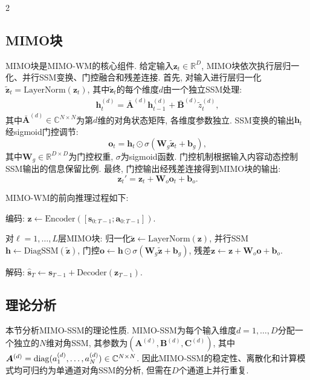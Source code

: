 \begin{multicols}{2}
\subsection{MIMO块}

\begin{Def}
MIMO块是MIMO-WM的核心组件.
给定输入${\bm z}_t \in \mathbb{R}^D$, MIMO块依次执行层归一化、并行SSM变换、门控融合和残差连接.
首先, 对输入进行层归一化$\tilde{{\bm z}}_t = \text{LayerNorm}({\bm z}_t)$,
其中$\tilde{{\bm z}}_t$的每个维度$d$由一个独立SSM处理:
\begin{eqnarray}
{\bm h}_t^{(d)} = \bar{{\bm A}}^{(d)}{\bm h}_{t-1}^{(d)} + \bar{{\bm B}}^{(d)}\tilde{z}_t^{(d)},
\end{eqnarray}
其中$\bar{{\bm A}}^{(d)} \in \mathbb{C}^{N \times N}$为第$d$维的对角状态矩阵, 各维度参数独立.
SSM变换的输出${\bm h}_t$经sigmoid门控调节:
\begin{equation}
{\bm o}_t = {\bm h}_t \odot \sigma({\bm W}_g\tilde{{\bm z}}_t + {\bm b}_g),
\end{equation}
其中${\bm W}_g \in \mathbb{R}^{D \times D}$为门控权重, $\sigma$为sigmoid函数.
门控机制根据输入内容动态控制SSM输出的信息保留比例.
最终, 门控输出经残差连接得到MIMO块的输出:
\begin{equation}
{\bm z}_t' = {\bm z}_t + {\bm W}_o{\bm o}_t + {\bm b}_o.
\end{equation}
\end{Def}

MIMO-WM的前向推理过程如下:
\begin{Ste}编码: ${\bm z} \leftarrow \text{Encoder}([{\bm s}_{0:T{-}1}; {\bm a}_{0:T{-}1}])$.\end{Ste}
\begin{Ste}对$\ell = 1, \ldots, L$层MIMO块:
归一化$\tilde{{\bm z}} \leftarrow \text{LayerNorm}({\bm z})$,
并行SSM${\bm h} \leftarrow \text{DiagSSM}(\tilde{{\bm z}})$,
门控${\bm o} \leftarrow {\bm h} \odot \sigma({\bm W}_g\tilde{{\bm z}} + {\bm b}_g)$,
残差${\bm z} \leftarrow {\bm z} + {\bm W}_o{\bm o} + {\bm b}_o$.\end{Ste}
\begin{Ste}解码: $\hat{{\bm s}}_T \leftarrow {\bm s}_{T{-}1} + \text{Decoder}({\bm z}_{T{-}1})$.\end{Ste}

\subsection{理论分析}
    
本节分析MIMO-SSM的理论性质.
MIMO-SSM为每个输入维度$d=1,\ldots,D$分配一个独立的$N$维对角SSM,
其参数为$({\bm A}^{(d)}, {\bm B}^{(d)}, {\bm C}^{(d)})$,
其中${\bm A}^{(d)} = {\rm diag}(a_1^{(d)}, \ldots, a_N^{(d)}) \in \mathbb{C}^{N \times N}$.
因此MIMO-SSM的稳定性、离散化和计算模式均可归约为单通道对角SSM的分析,
但需在$D$个通道上并行重复.


\end{multicols}
